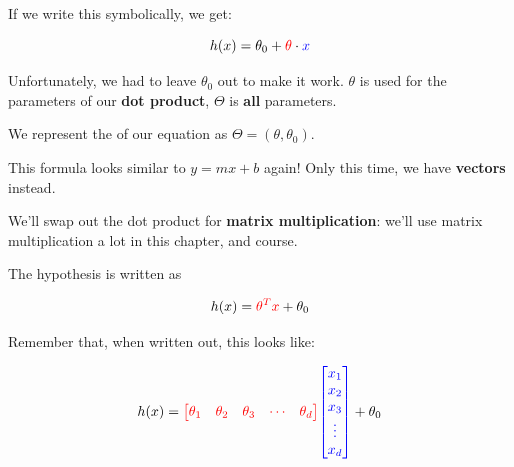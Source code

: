         If we write this symbolically, we get:
        
        \begin{equation}
            h(x) = \theta_0 + \textcolor{red}{\theta} \cdot \textcolor{blue}{x} 
        \end{equation}
        
        Unfortunately, we had to leave $\theta_0$ out to make it work. $\theta$ is used for the parameters of our \textbf{dot product}, $\Theta$ is \textbf{all} parameters.\\
        
        \begin{notation}
            We represent the  of our  equation as $\Theta = (\theta, \theta_0)$.
        \end{notation}
        
        This formula looks similar to $y=mx+b$ again! Only this time, we have \textbf{vectors} instead.
        
        We'll swap out the dot product for \textbf{matrix multiplication}: we'll use matrix multiplication a lot in this chapter, and course.
        \\
        
        \begin{kequation}
            The  hypothesis is written as
            
            \begin{equation*}
                h(x) = \textcolor{red}{ \theta^T x } + \theta_0
            \end{equation*}
        \end{kequation}
        
        
        Remember that, when written out, this looks like:
        
        \begin{equation}
            h(x) = 
            \textcolor{red}{
                \begin{bmatrix}
                    \theta_1 & \theta_2 & \theta_3 & \cdots & \theta_d
                \end{bmatrix}
            }
            \textcolor{blue}{
                \begin{bmatrix}
                    x_1 \\ x_2 \\ x_3 \\ \vdots \\ x_d
                \end{bmatrix}
            }
            + \theta_0
        \end{equation}
        
